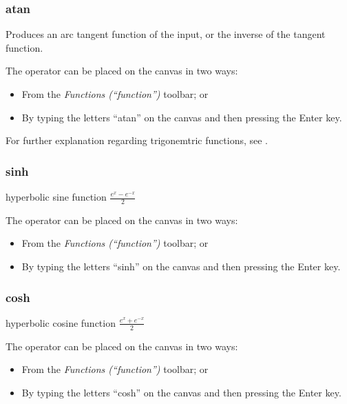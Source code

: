 \subsubsection{atan}


\label{Operation:atan} Produces an arc tangent function of the input,
or the inverse of the tangent function.

The operator can be placed on the canvas in two ways:
\begin{itemize}
\item From the \emph{Functions (``function'')} toolbar; or 
\item By typing the letters ``atan'' on the canvas and then pressing the
Enter key.
\end{itemize}
For further explanation regarding trigonemtric functions, see .

\subsubsection{sinh}


\label{Operation:sinh} hyperbolic sine function $\frac{e^{x}-e^{-x}}{2}$ 

The operator can be placed on the canvas in two ways:
\begin{itemize}
\item From the \emph{Functions (``function'')} toolbar; or 
\item By typing the letters ``sinh'' on the canvas and then pressing the
Enter key.
\end{itemize}

\subsubsection{cosh}


\label{Operation:cosh} hyperbolic cosine function $\frac{e^{x}+e^{-x}}{2}$ 

The operator can be placed on the canvas in two ways:
\begin{itemize}
\item From the \emph{Functions (``function'')} toolbar; or 
\item By typing the letters ``cosh'' on the canvas and then pressing the
Enter key.
\end{itemize}

